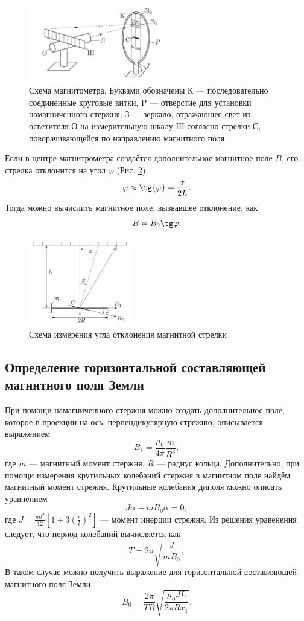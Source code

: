 \documentclass[12pt]{article}
\begin{document}
\begin{figure}[H]
    \centering
    \includegraphics[width=0.6\textwidth]{scheme1.png}
    \caption{Схема магнитометра. Буквами обозначены 
    К --- последовательно соединённые круговые витки, 
    P --- отверстие для установки намагниченного стержня, 
    З --- зеркало, отражающее свет из осветителя О на измерительную 
    шкалу Ш согласно стрелки С, поворачивающейся по направлению магнитного поля
    }
    \label{pic:scheme}
\end{figure}

Если в центре магнитрометра создаётся дополнительное магнитное поле $B$, его стрелка отклонится на 
угол $\varphi$ (Рис. \ref{pic:scheme2}):
\[
    \varphi \approx \tg{\varphi} = \frac{x}{2L}.
\] 
Тогда можно вычислить магнитное поле, вызвавшее отклонение, как 
\[
    B = B_0 \tg \varphi.
\]
\begin{figure}[H]
    \centering
    \includegraphics[width=0.4\textwidth]{scheme2.png}
    \caption{Схема измерения угла отклонения магнитной стрелки}
    \label{pic:scheme2}
\end{figure}

\subsection{Определение горизонтальной составляющей магнитного поля Земли}
При помощи намагниченного стержня можно создать дополнительное поле, которое в проекции на ось, перпендикулярную стрежню, описывается выражением
\[
    B_1 = \frac{\mu_0}{4 \pi } \frac{m}{R^3},
\]
где $m$ --- магнитный момент стержня, $R$ --- радиус кольца. 
Дополнительно, при помощи измерения крутильных колебаний стержня в магнитном поле найдём магнитный момент стрежня. 
Крутильные колебания диполя можно описать уравнением
\[
    J \ddot \alpha + m B_0 \alpha  = 0,
\]
где $J = \frac{ml^2}{12} \left[ 1 + 3 \left( \frac{r}{l} \right)^2  \right] $ --- момент инерции стрежня. Из решения уравенения следует, что 
период колебаний вычисляется как 
\[
    T = 2 \pi \sqrt{\frac{J}{mB_0}},
\]  
В таком случае можно получить выражение для горизонтальной составляющей магнитного поля Земли 
\[
    B_0 = \frac{2 \pi }{TR} \sqrt{\frac{\mu_0 J L}{2 \pi R x_1}}.
\]
\end{document}

